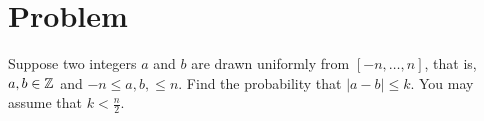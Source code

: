 \documentclass[10pt]{article}
\newcommand{\classcode}{CS 70}
\newcommand{\classname}{Problems}
\renewcommand{\maketitle}{%
\hrule height4pt
\large{Eric Du \hfill \classcode}
\newline
\large{HW 1} \Large{\hfill \classname \hfill} \large{\today}
\hrule height4pt \vskip .7em
\normalsize
}
\begin{document}



	
\section*{Problem}
	Suppose two integers \( a \) and \( b \) are drawn uniformly from \( [-n, \dots, n] \), 
	that is, \( a, b \in \mathbb Z \) and \( -n \le a,b, \le n \). Find the probability that \( |a-b| \le k \). 
	You may assume that \( k < \frac{n}{2} \). 
\end{document}
